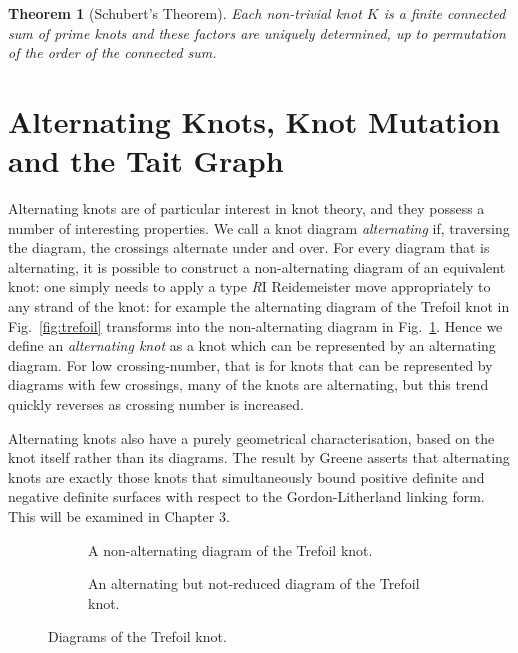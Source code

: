 \documentclass[12pt]{report}
\newtheorem*{theorem}{Theorem}
\theoremstyle{upright}
\begin{document}
\begin{theorem}[Schubert's Theorem]
	Each non-trivial knot $K$ is a finite connected sum of prime knots and these factors are uniquely determined, up to permutation of the order of the connected sum. 
\end{theorem}

\section{Alternating Knots, Knot Mutation and the Tait Graph}
Alternating knots are of particular interest in knot theory, and they possess a number of interesting properties. We call a knot diagram \textit{alternating} if, traversing the diagram, the crossings alternate under and over. For every diagram that is alternating, it is possible to construct a non-alternating diagram of an equivalent knot: one simply needs to apply a type \textit{R}I Reidemeister move appropriately to any strand of the knot: for example the alternating diagram of the Trefoil knot in Fig.~\ref{fig:trefoil} transforms into the non-alternating diagram in Fig.~\ref{fig:trefoil-nonalternating}. Hence we define an \textit{alternating knot} as a knot which can be represented by an alternating diagram. For low crossing-number, that is for knots that can be represented by diagrams with few crossings, many of the knots are alternating, but this trend quickly reverses as crossing number is increased.

Alternating knots also have a purely geometrical characterisation, based on the knot itself rather than its diagrams. The result by Greene \cite{alternating-links-definite-surfaces} asserts that alternating knots are exactly those knots that simultaneously bound positive definite and negative definite surfaces with respect to the Gordon-Litherland linking form. This will be examined in Chapter 3.

\begin{figure}[hbt!]
	\centering
	\hspace*{\fill}
	\begin{subfigure}[b]{0.4 \textwidth}
		\centering
		\def\svgscale{0.23}
		
		\caption{A non-alternating diagram of the Trefoil knot.}
		\label{fig:trefoil-nonalternating}
	\end{subfigure}
	\hspace*{\fill} \hspace*{\fill}	\hspace*{\fill}
	\begin{subfigure}[b]{0.4 \textwidth}
		\centering
		\def\svgscale{0.23}
		
		\caption{An alternating but not-reduced diagram of the Trefoil knot.}
		\label{fig:trefoil-nugatory}
	\end{subfigure}
	\hspace*{\fill} 
	\caption{Diagrams of the Trefoil knot.}
	\label{fig:trefoil-diagrams}
\end{figure}
\end{document}
